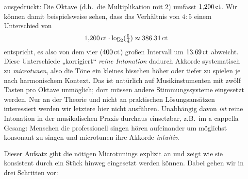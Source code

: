 \documentclass[british,11pt]{scrartcl}
\begin{document}
ausgedrückt: Die Oktave (d.h.\ die Multiplikation mit $2$) umfasst
$1{,}200\,\mathrm{ct}$. Wir können damit beispielsweise sehen, dass das Verhältnis
von $4:5$ einem Unterschied von
\[1{,}200\,\mathrm{ct}\cdot \log_2(\tfrac54) \approx 386.31\,\mathrm{ct}\]%
entspricht, es also von dem vier  ($400\,\mathrm{ct}$) großen Intervall um
$13.69\,\mathrm{ct}$ abweicht. Diese Unterschiede „korrigiert“
\emph{reine Intonation} dadurch Akkorde systematisch zu \emph{microtunen}, also
die Töne ein kleines bisschen höher oder tiefer zu spielen je nach harmonischem
Kontext. Das ist natürlich auf Musikinstumenten mit zwölf Tasten pro Oktave
unmöglich; dort müssen andere Stimmungssysteme eingesetzt werden. Nur an der
Theorie und nicht an praktischen Lösungsansätzen interessiert werden wir
letztere hier nicht ausführen. Unabhängig davon \emph{ist} reine Intonation in
der musikalischen Praxis durchaus einsetzbar, z.B.\ im a cappella Gesang:
Menschen die professionell singen hören aufeinander um möglichst konsonant zu
singen und microtunen ihre Akkorde \emph{intuitiv}.

Dieser Aufsatz gibt die nötigen Microtunings explizit an und zeigt wie sie
konsistent durch ein Stück hinweg eingesetzt werden können. Dabei gehen wir in
drei Schritten vor:
\end{document}
